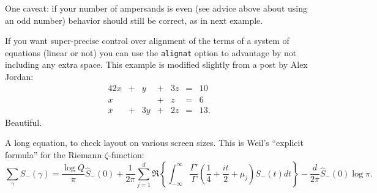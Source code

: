 \documentclass{amsart}
\theoremstyle{plain}%
\theoremstyle{definition}%
\theoremstyle{remark}%
\newcommand{\mono}[1]{\texttt{#1}}
\numberwithin{equation}{section}
\newcommand{\amp}{&}
\begin{document}
One caveat: if your number of ampersands is even (see advice above about using an odd number) behavior should still be correct, as in next example.%
\par
If you want super-precise control over alignment of the terms of a system of equations (linear or not) you can use the \mono{alignat} option to advantage by not including any extra space.  This example is modified slightly from a post by Alex Jordan:%
\begin{alignat*}{4}
2x \amp {}+{} \amp  y \amp {}+{} \amp 3z \amp {}={} \amp 10\\
x  \amp       \amp    \amp {}+{} \amp  z \amp {}={} \amp 6\\
x  \amp {}+{} \amp 3y \amp {}+{} \amp 2z \amp {}={} \amp 13.
\end{alignat*}
Beautiful.%
\par
A long equation, to check layout on various screen sizes.  This is Weil's ``explicit formula'' for the Riemann \(\zeta\)-function:%
\begin{equation}
\sum_\gamma S_-(\gamma) = \frac{\log Q}{\pi} \hat S_-(0)
+ \frac{1}{2\pi} \sum_{j=1}^d \Re\left\{ \int_{-\infty}^\infty \frac{\Gamma'}{\Gamma}\left(\frac{1}{4} + \frac{it}{2} + \mu_j\right)S_-(t) dt\right\}
- \frac{d}{2\pi}\hat S_-(0)\log \pi\text{.}\label{section-mathematics-4-8-3}
\end{equation}
%
\end{document}
